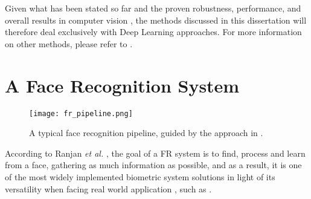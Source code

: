 \documentclass[class=report, crop=false, a4paper, 12pt]{standalone}
\begin{document}
\par Given what has been stated so far and the proven robustness, performance, and overall results in computer vision , the methods discussed in this dissertation will therefore deal exclusively with Deep Learning approaches. For more information on other methods, please refer to \autocite{learned-millerLabeledFacesWild2016}.




\newpage
\section{A Face Recognition System}

\begin{figure}[!h]
    \texttt{[image: fr\_pipeline.png]}
    \caption[Pipeline]{A typical face recognition pipeline, guided by the approach in \autocite{wangDeepFaceRecognition2021}.}
    \label{fig:fr pipeline}
\end{figure}

\par According to Ranjan \textit{et al.} \autocite{ranjanDeepLearningUnderstanding2018}, the goal of a FR system is to find, process and learn from a face, gathering as much information as possible, and as a result, it is one of the most widely implemented biometric system solutions in light of its versatility when facing real world application \autocite{duElementsEndtoendDeep2022}, such as .
\end{document}
